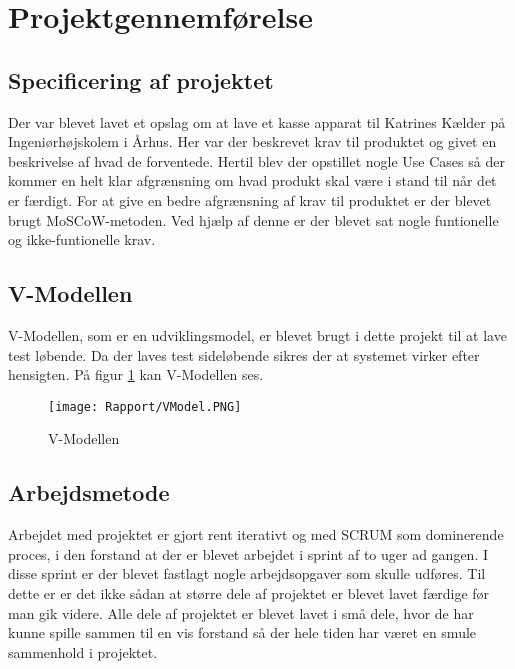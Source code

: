 \section{Projektgennemførelse}
\subsection{Specificering af projektet}
Der var blevet lavet et opslag om at lave et kasse apparat til Katrines Kælder på Ingeniørhøjskolem i Århus. Her var der beskrevet krav til produktet og givet en beskrivelse af hvad de forventede. \newline
Hertil blev der opstillet nogle Use Cases så der kommer en helt klar afgrænsning om hvad produkt skal være i stand til når det er færdigt.\newline
For at give en bedre afgrænsning af krav til produktet er der blevet brugt MoSCoW-metoden. Ved hjælp af denne er der blevet sat nogle funtionelle og ikke-funtionelle krav. 

\subsection{V-Modellen}

V-Modellen, som er en udviklingsmodel, er blevet brugt i dette projekt til at lave test løbende. Da der laves test sideløbende sikres der at systemet virker efter hensigten. På figur \ref{VModel} kan V-Modellen ses.

\begin{figure}[H]
	\centering
	\texttt{[image: Rapport/VModel.PNG]}
	\caption{V-Modellen}
	\label{VModel}
\end{figure} 


\subsection{Arbejdsmetode}
Arbejdet med projektet er gjort rent iterativt og med SCRUM som dominerende proces, i den forstand at der er blevet arbejdet i sprint af to uger ad gangen. I disse sprint er der blevet fastlagt nogle arbejdsopgaver som skulle udføres. Til dette er er det ikke sådan at større dele af projektet er blevet lavet færdige før man gik videre. Alle dele af projektet er blevet lavet i små dele, hvor de har kunne spille sammen til en vis forstand så der hele tiden har været en smule sammenhold i projektet. 

